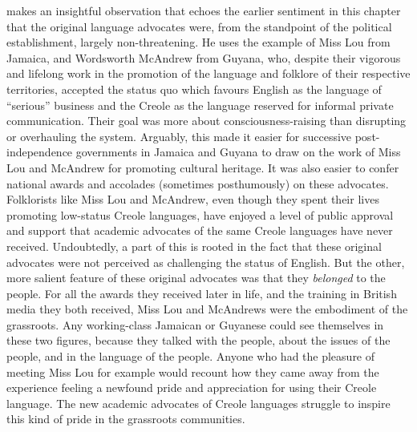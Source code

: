 \documentclass[output=paper,colorlinks,citecolor=brown]{langscibook}
\begin{document}
\citet{Devonish2015-LanguageLiberation} makes an insightful observation that echoes the earlier sentiment in this chapter that the original language advocates were, from the standpoint of the political establishment, largely non-threatening. He uses the example of Miss Lou from Jamaica, and Wordsworth McAndrew from Guyana, who, despite their vigorous and lifelong work in the promotion of the language and folklore of their respective territories, accepted the status quo which favours English as the language of “serious” business and the Creole as the language reserved for informal private communication. Their goal was more about consciousness-raising than disrupting or overhauling the system. Arguably, this made it easier for successive post-independence governments in Jamaica and Guyana to draw on the work of Miss Lou and McAndrew for promoting cultural heritage. It was also easier to confer national awards and accolades (sometimes posthumously) on these advocates. Folklorists like Miss Lou and McAndrew, even though they spent their lives promoting low-status Creole languages, have enjoyed a level of public approval and support that academic advocates of the same Creole languages have never received. Undoubtedly, a part of this is rooted in the fact that these original advocates were not perceived as challenging the status of English. But the other, more salient feature of these original advocates was that they \emph{belonged} to the people. For all the awards they received later in life, and the training in British media they both received, Miss Lou and McAndrews were the embodiment of the grassroots. Any working-class Jamaican or Guyanese could see themselves in these two figures, because they talked with the people, about the issues of the people, and in the language of the people. Anyone who had the pleasure of meeting Miss Lou for example would recount how they came away from the experience feeling a newfound pride and appreciation for using their Creole language. The new academic advocates of Creole languages struggle to inspire this kind of pride in the grassroots communities. 
\end{document}
